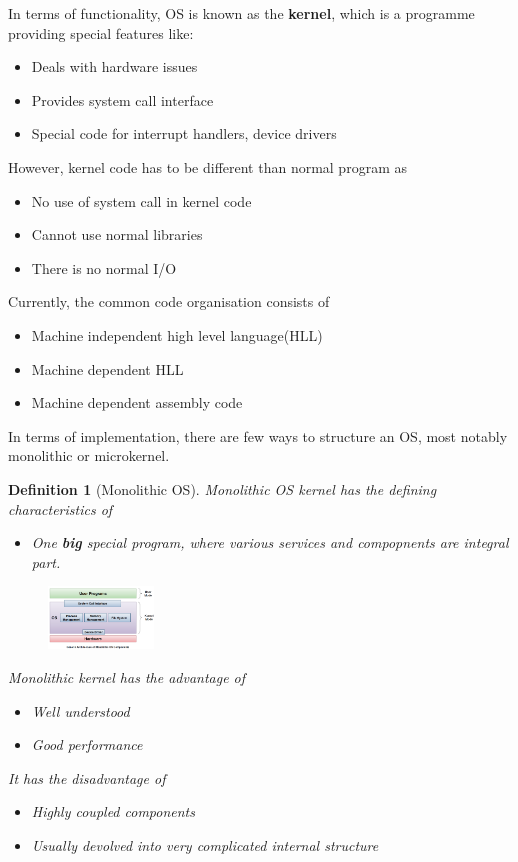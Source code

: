 \documentclass[11pt]{article}
\newtheorem{definition}{Definition}[section]
\theoremstyle{definition}
\begin{document}
In terms of functionality, OS is known as the \textbf{kernel}, which is a programme providing special features like:
\begin{itemize}[itemsep=0pt]
  \item Deals with hardware issues
  \item Provides system call interface
  \item Special code for interrupt handlers, device drivers
\end{itemize}
However, kernel code has to be different than normal program as
\begin{itemize}[itemsep=0pt]
  \item No use of system call in kernel code
  \item Cannot use normal libraries
  \item There is no normal I/O
\end{itemize}
Currently, the common code organisation consists of
\begin{itemize}[itemsep=0pt]
  \item Machine independent high level language(HLL)
  \item Machine dependent HLL
  \item Machine dependent assembly code
\end{itemize}
In terms of implementation, there are few ways to structure an OS, most notably monolithic or microkernel.
\begin{definition}[Monolithic OS]
\normalfont Monolithic OS kernel has the defining characteristics of
\begin{itemize}[itemsep=0pt]
  \item One \textbf{big} special program, where various services and compopnents are integral part.
\end{itemize}
\begin{figure}[h]
\centering
\includegraphics[width = 0.25\textwidth]{1_6.png}
\end{figure}
Monolithic kernel has the advantage of
\begin{itemize}[itemsep=0pt]
  \item Well understood
  \item Good performance
\end{itemize}
It has the disadvantage of
\begin{itemize}[itemsep=0pt]
  \item Highly coupled components
  \item Usually devolved into very complicated internal structure
\end{itemize}
\end{definition}
\end{document}

